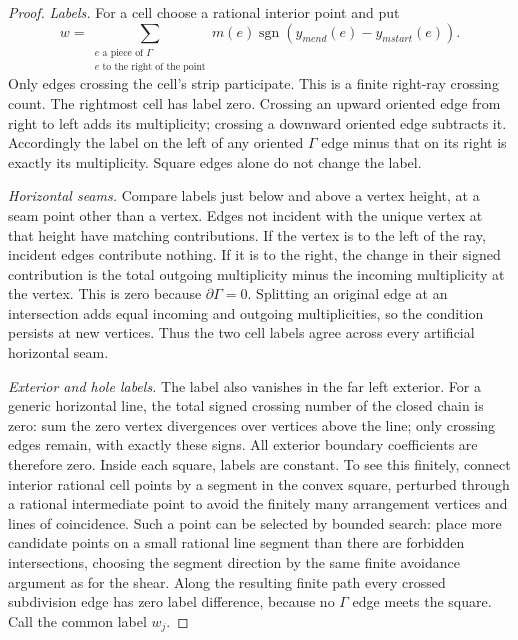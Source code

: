 \documentclass[11pt]{article}
\theoremstyle{definition}
\newcommand{\bd}{\partial}
\begin{document}
\begin{proof}
\emph{Labels.} For a cell choose a rational interior point and put
\begin{equation}\label{eq:raylabel}
 w=\sum_{\substack{e\text{ a piece of }\Gamma\\
                  e\text{ to the right of the point}}}
       m(e)\operatorname{sgn}(y_{
m end}(e)-y_{
m start}(e)).
\end{equation}
Only edges crossing the cell's strip participate. This is a finite
right-ray crossing count. The rightmost cell has label zero.
Crossing an upward oriented edge from right to left adds its
multiplicity; crossing a downward oriented edge subtracts it.
Accordingly the label on the left of any oriented \(\Gamma\) edge
minus that on its right is exactly its multiplicity. Square edges alone
do not change the label.

\emph{Horizontal seams.} Compare labels just below and above a vertex
height, at a seam point other than a vertex. Edges not incident with the
unique vertex at that height have matching contributions. If the vertex
is to the left of the ray, incident edges contribute nothing. If it is
to the right, the change in their signed contribution is the total
outgoing multiplicity minus the incoming multiplicity at the vertex.
This is zero because \(\bd\Gamma=0\). Splitting an original edge at an
intersection adds equal incoming and outgoing multiplicities, so the
condition persists at new vertices. Thus the two cell labels agree
across every artificial horizontal seam.

\emph{Exterior and hole labels.} The label also vanishes in the far
left exterior. For a generic horizontal line, the total signed crossing
number of the closed chain is zero: sum the zero vertex divergences
over vertices above the line; only crossing edges remain, with exactly
these signs. All exterior boundary coefficients are therefore zero.
Inside each square, labels are constant. To see this finitely, connect
interior rational cell points by a segment in the convex square,
perturbed through a rational intermediate point to avoid the finitely
many arrangement vertices and lines of coincidence. Such a point can
be selected by bounded search: place more candidate points on a small
rational line segment than there are forbidden intersections, choosing
the segment direction by the same finite avoidance argument as for the
shear. Along the resulting finite path every crossed subdivision edge
has zero label difference, because no \(\Gamma\) edge meets the square.
Call the common label \(w_j\).


\end{proof}
\end{document}
